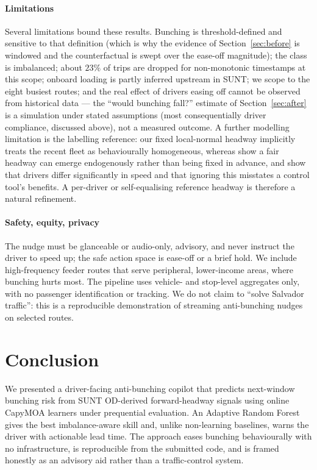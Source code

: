 \documentclass[11pt,a4paper]{article}
\begin{document}
\paragraph{Limitations}
Several limitations bound these results. Bunching is threshold-defined and sensitive to that
definition (which is why the evidence of Section~\ref{sec:before} is windowed and the
counterfactual is swept over the ease-off magnitude); the class is imbalanced; about $23\%$ of trips
are dropped for non-monotonic timestamps at this scope; onboard loading is partly inferred upstream
in SUNT; we scope to the eight busiest routes; and the real effect of drivers easing off cannot be
observed from historical data --- the ``would bunching fall?'' estimate of Section~\ref{sec:after}
is a simulation under stated assumptions (most consequentially driver compliance, discussed above),
not a measured outcome. A further modelling limitation is the labelling reference: our fixed
local-normal headway implicitly treats the recent fleet as behaviourally homogeneous, whereas
\citet{Bartholdi2012} show a fair headway can emerge endogenously rather than being fixed in advance,
and \citet{MartinezEstupinan2023} show that drivers differ significantly in speed and that ignoring
this misstates a control tool's benefits. A per-driver or self-equalising reference headway is
therefore a natural refinement.

\paragraph{Safety, equity, privacy}
The nudge must be glanceable or audio-only, advisory, and never instruct the driver to speed up;
the safe action space is ease-off or a brief hold. We include high-frequency feeder routes that
serve peripheral, lower-income areas, where bunching hurts most. The pipeline uses vehicle- and
stop-level aggregates only, with no passenger identification or tracking. We do not claim to
``solve Salvador traffic'': this is a reproducible demonstration of streaming anti-bunching
nudges on selected routes.

\section{Conclusion}
\label{sec:conclusion}

We presented a driver-facing anti-bunching copilot that predicts next-window bunching risk from
SUNT OD-derived forward-headway signals using online CapyMOA learners under prequential
evaluation. An Adaptive Random Forest gives the best imbalance-aware skill and, unlike
non-learning baselines, warns the driver with actionable lead time. The approach eases bunching
behaviourally with no infrastructure, is reproducible from the submitted code, and is framed
honestly as an advisory aid rather than a traffic-control system.
\end{document}
